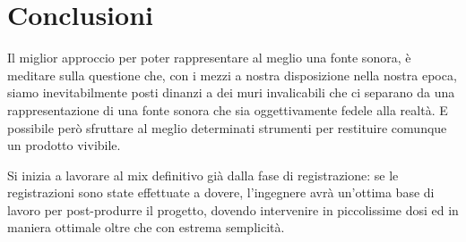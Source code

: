 \section{Conclusioni}

\begin{compactitem}
	\item Il miglior approccio per poter rappresentare al meglio una fonte sonora, è meditare sulla questione che, con i mezzi a nostra disposizione nella nostra epoca, siamo inevitabilmente posti dinanzi a dei muri invalicabili che ci separano da una rappresentazione di una fonte sonora che sia oggettivamente fedele alla realtà.
	E possibile però sfruttare al meglio determinati strumenti per restituire comunque un prodotto vivibile.
	\item Si inizia a lavorare al mix definitivo già dalla fase di registrazione: se le registrazioni sono state effettuate a dovere, l'ingegnere avrà un'ottima base di lavoro per post-produrre il progetto, dovendo intervenire in piccolissime dosi ed in maniera ottimale oltre che con estrema semplicità.
\end{compactitem}
	
	
	
	
	\vfill\null
	
	\newpage %
	
	
	\vfill\null
	
	\raggedright
	


